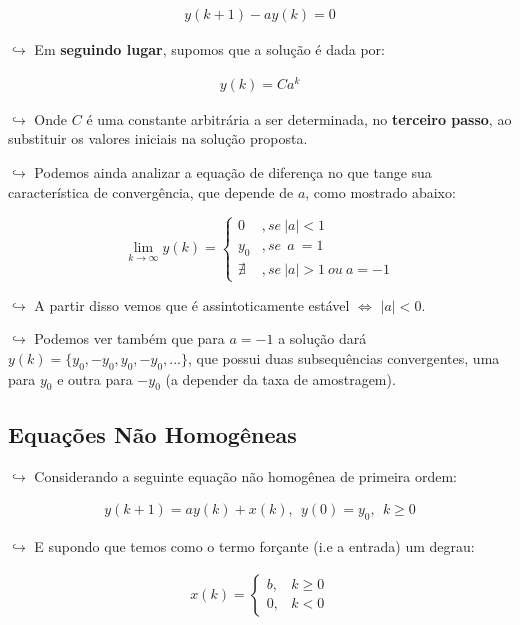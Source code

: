 \documentclass{article}
\begin{document}
\begin{itemize}
\[
\begin{align}
y(k+1) - ay(k) = 0
\end{align}
\]

\(\hookrightarrow\) Em \textbf{seguindo lugar}, supomos que a solução é
dada por:

\[
\begin{align}
y(k) = C a^k
\end{align}
\]

\(\hookrightarrow\) Onde \(C\) é uma constante arbitrária a ser
determinada, no \textbf{terceiro passo}, ao substituir os valores
iniciais na solução proposta.

\(\hookrightarrow\) Podemos ainda analizar a equação de diferença no que
tange sua característica de convergência, que depende de \(a\), como
mostrado abaixo:

\[
\lim_{k \rightarrow \infty} y(k) = \begin{cases}
0 & , se \ |a| < 1  \\ 
y_0 &, se \ \ a \ = 1 \\ 
\nexists & , se \ |a| > 1 \ ou \ a=-1
\end{cases}
\]

\(\hookrightarrow\) A partir disso vemos que é assintoticamente estável
\(\iff\) \(|a| < 0\).

\(\hookrightarrow\) Podemos ver também que para \(a = -1\) a solução
dará \(y(k) = \{y_0, -y_0, y_0, -y_0, ...\}\), que possui duas
subsequências convergentes, uma para \(y_0\) e outra para \(-y_0\) (a
depender da taxa de amostragem).

\hypertarget{equauxe7uxf5es-nuxe3o-homoguxeaneas}{%
\subsection{Equações Não
Homogêneas}\label{equauxe7uxf5es-nuxe3o-homoguxeaneas}}

\(\hookrightarrow\) Considerando a seguinte equação não homogênea de
primeira ordem:

\[
\begin{align}
y(k+1) = ay(k) + x(k),  \ \ y(0)=y_0,  \ \ k \ge 0
\end{align}
\]

\(\hookrightarrow\) E supondo que temos como o termo forçante (i.e a
entrada) um degrau:

\[
\begin{align}
x(k) = \begin{cases}
b,& k \ge 0 \\ 
0, & k<0
\end{cases}
\end{align}
\]


\end{itemize}
\end{document}
